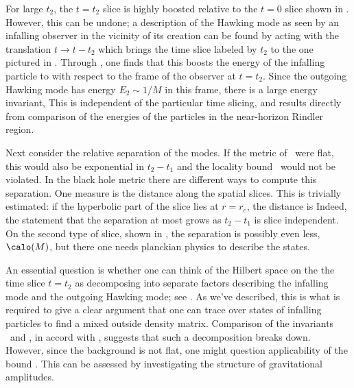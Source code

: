 For large $t_2$, the $t=t_2$ slice is highly boosted relative to the $t=0$ slice shown in \Krusk.  However, this can be undone;
a description of the Hawking mode as seen by an infalling observer in the vicinity of its creation can be found by acting with the translation $t\rightarrow t-t_2$ which brings the time slice labeled by $t_2$ to the one pictured in \Krusk.  Through \kruskxm, one finds that this boosts the energy of the infalling particle to 
%
\eqn{}
%
with respect to the frame of the observer at $t=t_2$.  Since the outgoing Hawking mode has energy $E_2\sim 1/M$ in this frame, there is a large energy invariant, 
%
\eqn{}
%
This is independent of the particular time slicing, and results directly from comparison of the energies of the particles in the near-horizon Rindler region.

Next consider the relative separation of the modes.  If the metric of \Krusk\ were flat, this would also be exponential in $t_2-t_1$ and the locality bound \locbd\ would not be violated.  In the black hole metric there are different ways to compute this separation.  One measure is the distance along the spatial slices.  This is trivially estimated: if the hyperbolic part of the slice lies at $r=r_c$, the distance is 
%
\eqn{}
%
Indeed, the statement that the separation at most grows as $t_2-t_1$ is slice independent.
On the second type of slice, shown in \singslice, the separation is possibly even less, $\calo(M)$, but there one needs planckian physics to describe the states.  



An essential question is whether one can think of the Hilbert space on the the time slice $t=t_2$ as decomposing into separate factors describing the infalling mode and the outgoing Hawking mode; see \intmodes.  As we've described, this is what is required to give a clear argument that one can trace over states of infalling particles to find a mixed outside density matrix.  
Comparison of the invariants \largeinvt\ and \distance, in accord with \locbd, suggests that such a decomposition breaks down.  However, since the background is not flat, one might question applicability of the bound \locbd.  This can be assessed by investigating the structure of gravitational amplitudes.

